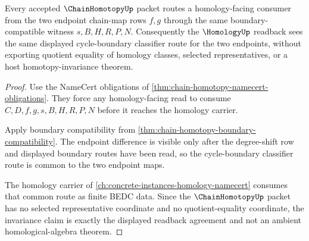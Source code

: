\begin{theorem}
\label{thm:chain-homotopy-homology-invariance}
Every accepted $\ChainHomotopyUp$ packet routes a homology-facing consumer from the two endpoint chain-map rows $f,g$ through the same boundary-compatible witness $s,B,H,R,P,N$. Consequently the $\HomologyUp$ readback sees the same displayed cycle-boundary classifier route for the two endpoints, without exporting quotient equality of homology classes, selected representatives, or a host homotopy-invariance theorem.
\end{theorem}
\begin{proof}
Use the NameCert obligations of \autoref{thm:chain-homotopy-namecert-obligations}. They force any homology-facing read to consume $C,D,f,g,s,B,H,R,P,N$ before it reaches the homology carrier.

Apply boundary compatibility from \autoref{thm:chain-homotopy-boundary-compatibility}. The endpoint difference is visible only after the degree-shift row and displayed boundary routes have been read, so the cycle-boundary classifier route is common to the two endpoint maps.

The homology carrier of \autoref{ch:concrete-instances-homology-namecert} consumes that common route as finite BEDC data. Since the $\ChainHomotopyUp$ packet has no selected representative coordinate and no quotient-equality coordinate, the invariance claim is exactly the displayed readback agreement and not an ambient homological-algebra theorem.
\end{proof}


\begin{closurestatus}{\ChainHomotopyUp}
  \theoryclosure{\seedClosure}
  \formalstatus{\unformalizedV}
\end{closurestatus}

